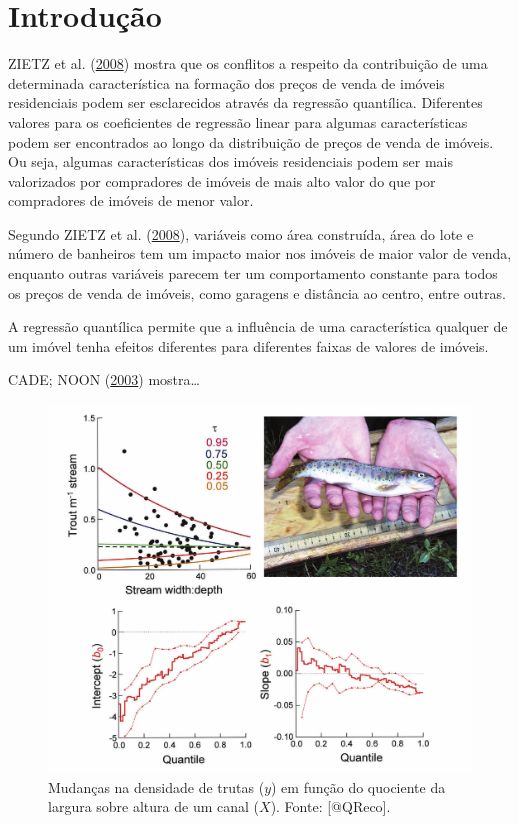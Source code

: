 \documentclass[a4paper, 12pt]{article}
\begin{document}
\hypertarget{introducao}{%
\section{Introdução}\label{introducao}}

ZIETZ et al. (\protect\hyperlink{ref-Zietz}{2008}) mostra que os
conflitos a respeito da contribuição de uma determinada característica
na formação dos preços de venda de imóveis residenciais podem ser
esclarecidos através da regressão quantílica. Diferentes valores para os
coeficientes de regressão linear para algumas características podem ser
encontrados ao longo da distribuição de preços de venda de imóveis. Ou
seja, algumas características dos imóveis residenciais podem ser mais
valorizados por compradores de imóveis de mais alto valor do que por
compradores de imóveis de menor valor.

Segundo ZIETZ et al. (\protect\hyperlink{ref-Zietz}{2008}), variáveis
como área construída, área do lote e número de banheiros tem um impacto
maior nos imóveis de maior valor de venda, enquanto outras variáveis
parecem ter um comportamento constante para todos os preços de venda de
imóveis, como garagens e distância ao centro, entre outras.

A regressão quantílica permite que a influência de uma característica
qualquer de um imóvel tenha efeitos diferentes para diferentes faixas de
valores de imóveis.

CADE; NOON (\protect\hyperlink{ref-QReco}{2003}) mostra\ldots{}

\begin{figure}[H]

{\centering \includegraphics[width=1\linewidth]{images/-000} 

}

\caption{Mudanças na densidade de trutas ($y$) em função do quociente da largura sobre altura de um canal ($X$). Fonte: [@QReco].}\label{fig:trutas}
\end{figure}
\end{document}
